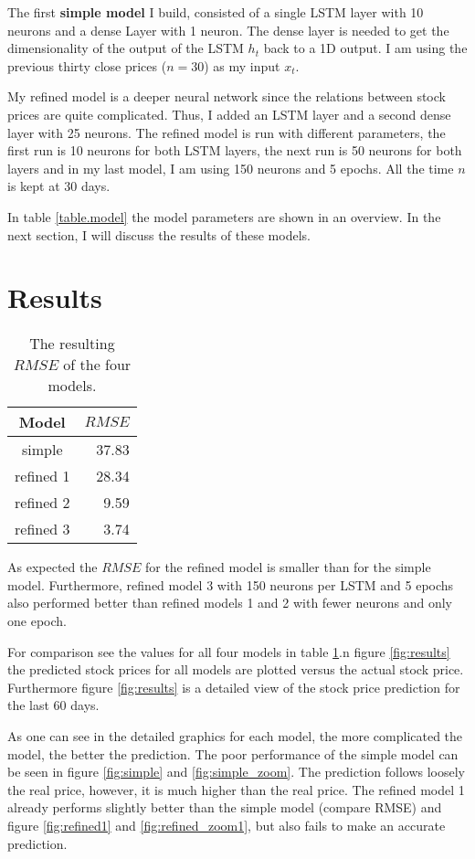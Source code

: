 \documentclass[fleqn,10pt]{SelfArx} %
\begin{document}
The first \textbf{simple model} I build, consisted of a single LSTM layer with 10 neurons and a dense Layer with 1 neuron. The dense layer is needed to get the dimensionality of the output of the LSTM $h_t$ back to a 1D output. I am using the previous thirty close prices ($n=30$) as my input $x_t$.

My refined model is a deeper neural network since the relations between stock prices are quite complicated. Thus, I added an LSTM layer and a second dense layer with 25 neurons. The refined model is run with different parameters, the first run is 10 neurons for both LSTM layers, the next run is 50 neurons for both layers and in my last model, I am using 150 neurons and 5 epochs. All the time $n$ is kept at $30$ days.

In table \ref{table.model} the model parameters are shown in an overview. In the next section, I will discuss the results of these models.


\section{Results}

\begin{table}[H]
	\caption{The resulting $RMSE$ of the four models.}
	\centering
	\begin{tabular}{cr}
	\hline 
	Model & $RMSE$ \\ 
	\hline 
	simple & 37.83 \\ 
	refined 1 & 28.34 \\ 
	refined 2 & 9.59 \\ 
	refined 3 & 3.74 \\ 
	\hline 
	\end{tabular} 
	\label{tab:rsme}
\end{table}

As expected the $RMSE$ for the refined model is smaller than for the simple model. Furthermore, refined model 3 with 150 neurons per LSTM and 5 epochs also performed better than refined models 1 and 2 with fewer neurons and only one epoch. 

For comparison see the values for all four models in table \ref{tab:rsme}.n figure \ref{fig:results} the predicted stock prices for all models are plotted versus the actual stock price. Furthermore figure \ref{fig:results} is a detailed view of the stock price prediction for the last 60 days. 

As one can see in the detailed graphics for each model, the more complicated the model, the better the prediction. The poor performance of the simple model can be seen in figure \ref{fig:simple} and \ref{fig:simple_zoom}. The prediction follows loosely the real price, however, it is much higher than the real price.  The refined model 1 already performs slightly better than the simple model (compare RMSE) and figure \ref{fig:refined1} and \ref{fig:refined_zoom1}, but also fails to make an accurate prediction.
\end{document}

